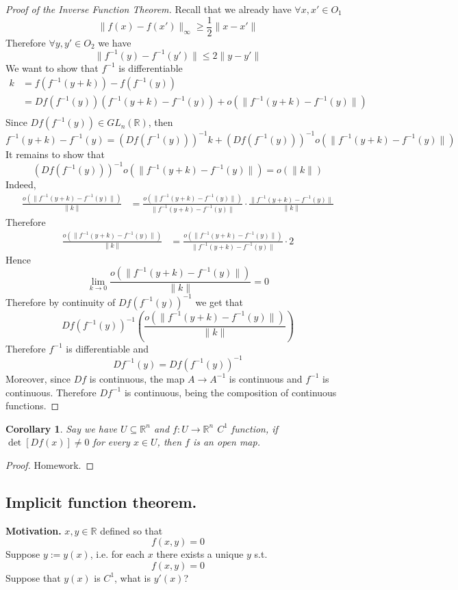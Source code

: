 \documentclass[11pt,a4paper]{article}
\theoremstyle{definition}
\theoremstyle{plain}
\newtheorem{corollary}[definition]{Corollary}
\theoremstyle{remark}
\newcommand{\R}{\mathbb{R}}
\newcommand{\norm}[1]{\lVert #1 \rVert}
\begin{document}
\begin{proof}[Proof of the Inverse Function Theorem]
    Recall that we already have $\forall x,x' \in O_1$ 
    $$\norm{f(x)-f(x')}_\infty \ge \frac{1}{2} \norm{x-x'}$$
    Therefore $\forall y,y' \in O_2$ we have 
    $$\norm{f^{-1} (y) - f^{-1}(y')} \le 2 \norm{y-y'}$$
    We want to show that $f^{-1}$ is differentiable 
    \begin{align*}
        k &= f (f^{-1} (y+k)) - f(f^{-1}(y)) \\
        &= Df (f^{-1}(y)) \left(f^{-1}(y+k) - f^{-1}(y)\right) + o(\norm{f^{-1}(y+k) - f^{-1}(y)}) \\
    \end{align*}
    Since $Df(f^{-1}(y)) \in GL_n(\R)$, then 
    $$f^{-1}(y + k) - f^{-1} (y) = (Df(f^{-1}(y)))^{-1} k + (Df(f^{-1}(y)))^{-1} o(\norm{f^{-1}(y+k) - f^{-1}(y)})$$
    It remains to show that 
    $$(Df(f^{-1}(y)))^{-1} o(\norm{f^{-1}(y+k) - f^{-1}(y)}) = o(\norm{k})$$
    Indeed, 
    \begin{align*}
        \frac{o(\norm{f^{-1}(y+k) - f^{-1}(y)})}{\norm{k}} &= \frac{o(\norm{f^{-1}(y+k) - f^{-1}(y)})}{\norm{f^{-1}(y+k) - f^{-1}(y)}} \cdot \frac{\norm{f^{-1}(y+k) - f^{-1}(y)}}{\norm{k}}
    \end{align*}
    Therefore 
    \begin{align*}
        \frac{o(\norm{f^{-1}(y+k) - f^{-1}(y)})}{\norm{k}} &= \frac{o(\norm{f^{-1}(y+k) - f^{-1}(y)})}{\norm{f^{-1}(y+k) - f^{-1}(y)}} \cdot 2
    \end{align*}
    Hence 
    $$\lim_{k \to 0} \frac{o(\norm{f^{-1}(y+k) - f^{-1}(y)})}{\norm{k}} = 0$$
    Therefore by continuity of $Df(f^{-1}(y))^{-1}$ we get that 
    $$Df(f^{-1}(y))^{-1} \left(\frac{o(\norm{f^{-1}(y+k) - f^{-1}(y)})}{\norm{k}}\right)$$
    Therefore $f^{-1}$ is differentiable and 
    $$Df^{-1}(y) = Df (f^{-1}(y))^{-1}$$
    Moreover, since $Df$ is continuous, the map $A \to A^{-1}$ is continuous and $f^{-1}$ is continuous. 
    Therefore $Df^{-1}$ is continuous, being the composition of continuous functions. 
\end{proof}

\begin{corollary}
    Say we have $U \subseteq \R^n$ and $f \colon U \to \R^n$ $C^1$ function, if $\det [Df(x)] \ne 0$ for every $x \in U$, then 
    $f$ is an open map.  
\end{corollary}

\begin{proof}
    Homework.
\end{proof}

\subsection{Implicit function theorem.} 
\textbf{Motivation.} $x, y \in \R$ defined so that 
$$f(x,y) = 0$$
Suppose $y := y(x)$, i.e. for each $x$ there exists a unique $y$ s.t.
$$f(x,y) = 0$$
Suppose that $y(x)$ is $C^1$, what is $y'(x)$? 
\end{document}
